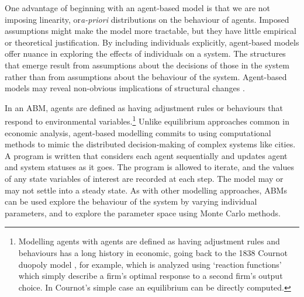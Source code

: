 One advantage of beginning with an agent-based model is that we are not imposing linearity, or\textit{a-priori} distributions on the behaviour of agents. Imposed assumptions might make the model more tractable, but they have little empirical or theoretical justification. 
By including individuals explicitly, agent-based models offer nuance in exploring the effects of individuals on a system. The structures that emerge result from assumptions about the decisions of those in the system rather than from assumptions about the behaviour of the system. Agent-based models may reveal non-obvious implications of structural changes \cite{darley_towards_1999, happe_agricultural_2004}. 






In an \gls{ABM}, agents are defined as having adjustment rules or behaviours that respond to environmental variables.\footnote{Modelling agents with agents are defined as having adjustment rules and behaviours has a long history in economic, going back to the 1838 Cournot duopoly model \cite{cournotRecherchesPrincipesMathematiques1838}, for example, which is analyzed using `reaction functions' which simply describe a firm's optimal response to a second firm's output choice. In Cournot's simple case an equilibrium can be directly computed.} 
Unlike equilibrium approaches common in economic analysis, agent-based modelling commits to using computational methods to mimic the distributed decision-making of complex systems like cities. A program is written that considers each agent sequentially and updates agent and system statuses as it goes. The program is allowed to iterate, and the values of any state variables of interest are recorded at each step. The model may or may not settle into a steady state. As with other modelling approaches, ABMs can be used explore the behaviour of the system by varying individual parameters, and to explore the parameter space using Monte Carlo methods.

